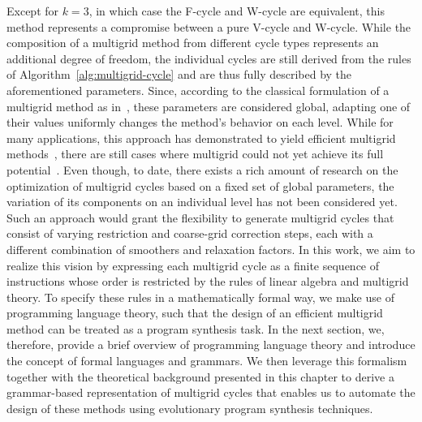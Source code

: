 Except for $k = 3$, in which case the F-cycle and W-cycle are equivalent, this method represents a compromise between a pure V-cycle and W-cycle.
While the composition of a multigrid method from different cycle types represents an additional degree of freedom, the individual cycles are still derived from the rules of Algorithm~\ref{alg:multigrid-cycle} and are thus fully described by the aforementioned parameters.
Since, according to the classical formulation of a multigrid method as in~\cite{brandt1977multi,hackbusch2013multi,trottenberg2000multigrid,briggs2000multigrid}, these parameters are considered global, adapting one of their values uniformly changes the method's behavior on each level. 
While for many applications, this approach has demonstrated to yield efficient multigrid methods~\cite{trottenberg2000multigrid}, there are still cases where multigrid could not yet achieve its full potential~\cite{ernst2012difficult,benzi2005numerical}.
Even though, to date, there exists a rich amount of research on the optimization of multigrid cycles based on a fixed set of global parameters, the variation of its components on an individual level has not been considered yet.
Such an approach would grant the flexibility to generate multigrid cycles that consist of varying restriction and coarse-grid correction steps, each with a different combination of smoothers and relaxation factors.
In this work, we aim to realize this vision by expressing each multigrid cycle as a finite sequence of instructions whose order is restricted by the rules of linear algebra and multigrid theory.
To specify these rules in a mathematically formal way, we make use of programming language theory, such that the design of an efficient multigrid method can be treated as a program synthesis task.
In the next section, we, therefore, provide a brief overview of programming language theory and introduce the concept of formal languages and grammars.
We then leverage this formalism together with the theoretical background presented in this chapter to derive a grammar-based representation of multigrid cycles that enables us to automate the design of these methods using evolutionary program synthesis techniques.